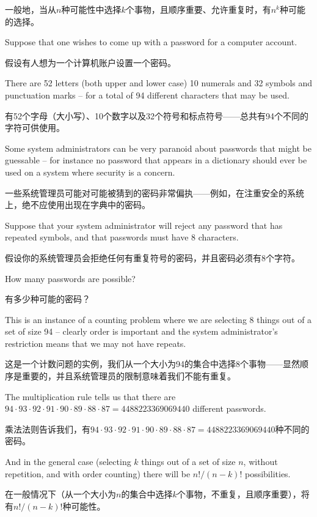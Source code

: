 一般地，当从$n$种可能性中选择$k$个事物，且顺序重要、允许重复时，有$n^k$种可能的选择。


Suppose that one wishes to come up with a password for a computer
account.

假设有人想为一个计算机账户设置一个密码。

There are 52 letters (both upper and lower case) 10 numerals
and 32 symbols and punctuation marks -- for a total of 94 different 
characters that 
may be used.

有52个字母（大小写）、10个数字以及32个符号和标点符号——总共有94个不同的字符可供使用。

Some system administrators can be very paranoid about
passwords that might be guessable -- for instance no password that 
appears in a dictionary should ever be used on a system where security
is a concern.

一些系统管理员可能对可能被猜到的密码非常偏执——例如，在注重安全的系统上，绝不应使用出现在字典中的密码。

Suppose that your system administrator will reject any 
password that has repeated symbols, and that passwords must have 8 
characters.

假设你的系统管理员会拒绝任何有重复符号的密码，并且密码必须有8个字符。

How many passwords are possible?    

有多少种可能的密码？

This is an instance of a counting problem where we are selecting 8 things
out of a set of size 94 -- clearly order is important and the system 
administrator's restriction means that we may not have repeats.

这是一个计数问题的实例，我们从一个大小为94的集合中选择8个事物——显然顺序是重要的，并且系统管理员的限制意味着我们不能有重复。

The multiplication rule tells us that there are 
$94\cdot 93\cdot 92\cdot 91\cdot 90\cdot 89\cdot 88\cdot 87 = 4488223369069440$
different passwords.

乘法法则告诉我们，有$94\cdot 93\cdot 92\cdot 91\cdot 90\cdot 89\cdot 88\cdot 87 = 4488223369069440$种不同的密码。

And in the general case (selecting $k$ things out 
of a set of size $n$, without repetition, and with order counting) 
there will be $n!/(n-k)!$ possibilities.

在一般情况下（从一个大小为$n$的集合中选择$k$个事物，不重复，且顺序重要），将有$n!/(n-k)!$种可能性。

